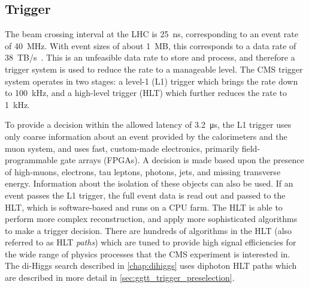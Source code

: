 \subsection{Trigger}\label{sec:trigger}

The beam crossing interval at the LHC is 25~\unit{ns}, corresponding to an event rate of 40~\unit{MHz}. With event sizes of about 1~\unit{MB}, this corresponds to a data rate of 38~\unit{TB/s}~\cite{CMS:2008xjf}. This is an unfeasible data rate to store and process, and therefore a trigger system is used to reduce the rate to a manageable level. The CMS trigger system operates in two stages: a level-1 (L1) trigger which brings the rate down to 100~\unit{kHz}, and a high-level trigger (HLT) which further reduces the rate to 1~\unit{kHz}. 

To provide a decision within the allowed latency of 3.2~\unit{\micro s}, the L1 trigger uses only coarse information about an event provided by the calorimeters and the muon system, and uses fast, custom-made electronics, primarily field-programmable gate arrays (FPGAs). A decision is made based upon the presence of high-\pt muons, electrons, tau leptons, photons, jets, and missing transverse energy. Information about the isolation of these objects can also be used. If an event passes the L1 trigger, the full event data is read out and passed to the HLT, which is software-based and runs on a CPU farm. The HLT is able to perform more complex reconstruction, and apply more sophisticated algorithms to make a trigger decision. 
There are hundreds of algorithms in the HLT (also referred to as HLT \textit{paths}) which are tuned to provide high signal efficiencies for the wide range of physics processes that the CMS experiment is interested in. The di-Higgs search described in \cref{chap:dihiggs} uses diphoton HLT paths which are described in more detail in \cref{sec:ggtt_trigger_preselection}.